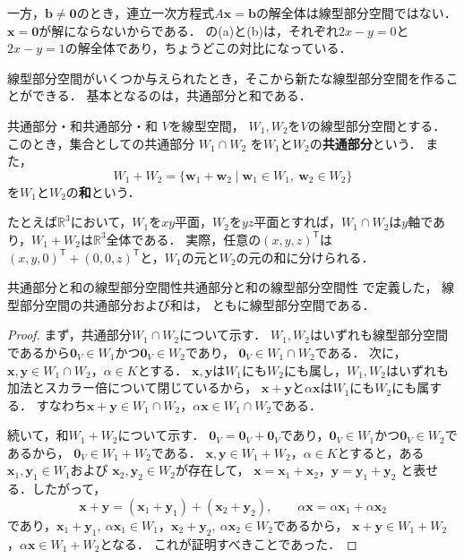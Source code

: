 一方，$\bm{b}\ne\bm{0}$のとき，連立一次方程式$A\bm{x}=\bm{b}$の解全体は線型部分空間ではない．
$\bm{x}=\bm{0}$が解にならないからである．
の(a)と(b)は，それぞれ$2x-y=0$と$2x-y=1$の解全体であり，ちょうどこの対比になっている．

線型部分空間がいくつか与えられたとき，そこから新たな線型部分空間を作ることができる．
基本となるのは，共通部分と和である．

\begin{definition}{共通部分・和}{共通部分・和}
  $V$を線型空間，
  $W_1,W_2$を$V$の線型部分空間とする．
  このとき，集合としての共通部分
  $W_1\cap W_2$
  を$W_1$と$W_2$の\textbf{共通部分}という．
  また，
  \[
  W_1+W_2
  =
  \{
  \bm{w}_1+\bm{w}_2
  \mid
  \bm{w}_1\in W_1,\
  \bm{w}_2\in W_2
  \}
  \]
  を$W_1$と$W_2$の\textbf{和}という．
\end{definition}

たとえば$\mathbb{R}^3$において，$W_1$を$xy$平面，$W_2$を$yz$平面とすれば，$W_1\cap W_2$は$y$軸であり，$W_1+W_2$は$\mathbb{R}^3$全体である．
実際，任意の$(x,y,z)^\mathsf{T}$は$(x,y,0)^\mathsf{T}+(0,0,z)^\mathsf{T}$と，$W_1$の元と$W_2$の元の和に分けられる．

\begin{prop}{共通部分と和の線型部分空間性}{共通部分と和の線型部分空間性}
  で定義した，
  線型部分空間の共通部分および和は，
  ともに線型部分空間である．
\end{prop}

\begin{tleftbar}
\begin{proof}
  まず，共通部分$W_1\cap W_2$について示す．
  $W_1,W_2$はいずれも線型部分空間であるから$\bm{0}_V\in W_1$かつ$\bm{0}_V\in W_2$であり，
  $\bm{0}_V\in W_1\cap W_2$である．
  次に，$\bm{x},\bm{y}\in W_1\cap W_2$，$\alpha\in K$とする．
  $\bm{x},\bm{y}$は$W_1$にも$W_2$にも属し，$W_1,W_2$はいずれも加法とスカラー倍について閉じているから，
  $\bm{x}+\bm{y}$と$\alpha\bm{x}$は$W_1$にも$W_2$にも属する．
  すなわち$\bm{x}+\bm{y}\in W_1\cap W_2$，$\alpha\bm{x}\in W_1\cap W_2$である．

  続いて，和$W_1+W_2$について示す．
  $\bm{0}_V=\bm{0}_V+\bm{0}_V$であり，$\bm{0}_V\in W_1$かつ$\bm{0}_V\in W_2$であるから，
  $\bm{0}_V\in W_1+W_2$である．
  $\bm{x},\bm{y}\in W_1+W_2$，$\alpha\in K$とすると，ある$\bm{x}_1,\bm{y}_1\in W_1$および
  $\bm{x}_2,\bm{y}_2\in W_2$が存在して，
  $\bm{x}=\bm{x}_1+\bm{x}_2$，$\bm{y}=\bm{y}_1+\bm{y}_2$
  と表せる．したがって，
  \[
    \bm{x}+\bm{y}
    =(\bm{x}_1+\bm{y}_1)+(\bm{x}_2+\bm{y}_2),
    \qquad
    \alpha\bm{x}
    =\alpha\bm{x}_1+\alpha\bm{x}_2
  \]
  であり，$\bm{x}_1+\bm{y}_1,~\alpha\bm{x}_1\in W_1$，$\bm{x}_2+\bm{y}_2,~\alpha\bm{x}_2\in W_2$であるから，
  $\bm{x}+\bm{y}\in W_1+W_2$，$\alpha\bm{x}\in W_1+W_2$となる．
  これが証明すべきことであった．
\end{proof}
\end{tleftbar}

